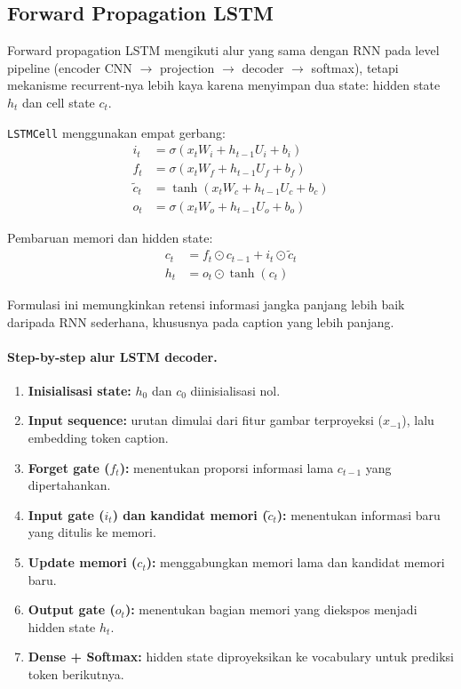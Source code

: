 \subsection{Forward Propagation LSTM}

Forward propagation LSTM mengikuti alur yang sama dengan RNN pada level pipeline (encoder CNN $\rightarrow$ projection $\rightarrow$ decoder $\rightarrow$ softmax), tetapi mekanisme recurrent-nya lebih kaya karena menyimpan dua state: hidden state $h_t$ dan cell state $c_t$.

\texttt{LSTMCell} menggunakan empat gerbang:
\begin{align}
i_t &= \sigma(x_t W_i + h_{t-1} U_i + b_i) \\
f_t &= \sigma(x_t W_f + h_{t-1} U_f + b_f) \\
\tilde{c}_t &= \tanh(x_t W_c + h_{t-1} U_c + b_c) \\
o_t &= \sigma(x_t W_o + h_{t-1} U_o + b_o)
\end{align}

Pembaruan memori dan hidden state:
\begin{align}
c_t &= f_t \odot c_{t-1} + i_t \odot \tilde{c}_t \\
h_t &= o_t \odot \tanh(c_t)
\end{align}

Formulasi ini memungkinkan retensi informasi jangka panjang lebih baik daripada RNN sederhana, khususnya pada caption yang lebih panjang.

\paragraph{Step-by-step alur LSTM decoder.}
\begin{enumerate}
    \item \textbf{Inisialisasi state:} $h_0$ dan $c_0$ diinisialisasi nol.
    \item \textbf{Input sequence:} urutan dimulai dari fitur gambar terproyeksi ($x_{-1}$), lalu embedding token caption.
    \item \textbf{Forget gate ($f_t$):} menentukan proporsi informasi lama $c_{t-1}$ yang dipertahankan.
    \item \textbf{Input gate ($i_t$) dan kandidat memori ($\tilde{c}_t$):} menentukan informasi baru yang ditulis ke memori.
    \item \textbf{Update memori ($c_t$):} menggabungkan memori lama dan kandidat memori baru.
    \item \textbf{Output gate ($o_t$):} menentukan bagian memori yang diekspos menjadi hidden state $h_t$.
    \item \textbf{Dense + Softmax:} hidden state diproyeksikan ke vocabulary untuk prediksi token berikutnya.
\end{enumerate}

